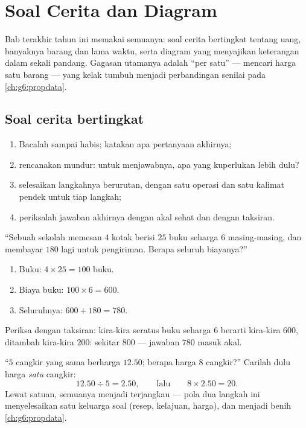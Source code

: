 \chapter{Soal Cerita dan Diagram}\label{ch:g5:data}

Bab terakhir tahun ini memakai semuanya: soal cerita bertingkat
tentang uang, banyaknya barang dan lama waktu, serta diagram yang
menyajikan keterangan dalam sekali pandang. Gagasan utamanya adalah
``per satu'' --- mencari harga satu barang --- yang kelak tumbuh
menjadi perbandingan senilai pada \cref{ch:g6:propdata}.

\section{Soal cerita bertingkat}

\begin{method}\label{met:g5:data:steps}
\begin{enumerate}
  \item Bacalah sampai habis; katakan apa pertanyaan akhirnya;
  \item rencanakan mundur: untuk menjawabnya, apa yang kuperlukan
        lebih dulu?
  \item selesaikan langkahnya berurutan, dengan satu operasi dan
        satu kalimat pendek untuk tiap langkah;
  \item periksalah jawaban akhirnya dengan akal sehat dan dengan
        taksiran.
\end{enumerate}
\end{method}

\begin{example}\label{ex:g5:data:multistep}
``Sebuah sekolah memesan $4$ kotak berisi $25$ buku seharga $6$
masing-masing, dan membayar $180$ lagi untuk pengiriman. Berapa
seluruh biayanya?''
\begin{enumerate}
  \item Buku: $4 \times 25 = 100$ buku.
  \item Biaya buku: $100 \times 6 = 600$.
  \item Seluruhnya: $600 + 180 = 780$.
\end{enumerate}
Periksa dengan taksiran: kira-kira seratus buku seharga $6$ berarti
kira-kira $600$, ditambah kira-kira $200$: sekitar $800$ --- jawaban $780$ masuk akal.
\end{example}

\begin{example}\label{ex:g5:data:perone}
``$5$ cangkir yang sama berharga $12.50$; berapa harga $8$ cangkir?''
Carilah dulu harga \emph{satu} cangkir:
\[
12.50 \div 5 = 2.50,
\qquad\text{lalu}\qquad
8 \times 2.50 = 20 .
\]
Lewat satuan, semuanya menjadi terjangkau --- pola dua langkah ini
menyelesaikan satu keluarga soal (resep, kelajuan, harga), dan
menjadi benih \cref{ch:g6:propdata}.
\end{example}


